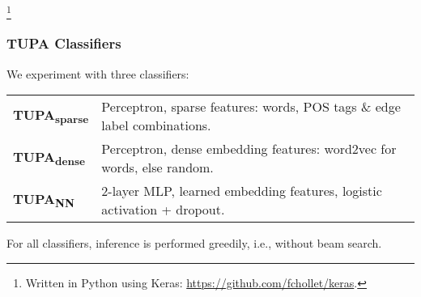 \documentclass[t]{beamer}
\newcommand{\parser}[1]{TUPA\textsubscript{#1}}
\begin{document}
\footnote{
Written in Python using Keras: \url{https://github.com/fchollet/keras}.}

\begin{frame}
\frametitle{\parser{} Classifiers}
We experiment with three classifiers:
\begin{flushleft}
	\begin{tabular}{ll}
	\textbf{\parser{sparse}} & Perceptron, sparse features: words, POS tags \& edge label combinations. \\
	\textbf{\parser{dense}} & Perceptron, dense embedding features: word2vec \cite{mikolov2013efficient} for words, else random. \\
	\textbf{\parser{NN}} & 2-layer MLP, learned embedding features, logistic activation + dropout. \\
	\end{tabular}
\end{flushleft}
\vspace{5mm}
For all classifiers, inference is performed greedily, i.e., without beam search.
\end{frame}
\end{document}
